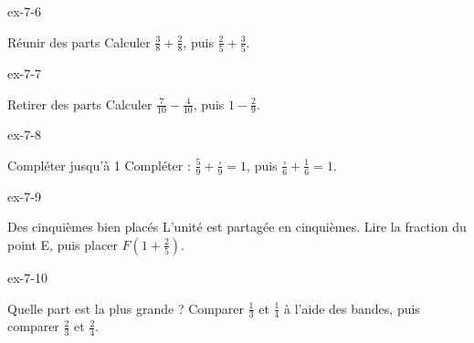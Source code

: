 \begin{blocLivre}{ex-7-6}\begin{exercice}[2]{Réunir des parts}
Calculer $\frac38+\frac28$, puis $\frac25+\frac35$.
\end{exercice}\end{blocLivre}
\begin{blocLivre}{ex-7-7}\begin{exercice}[2]{Retirer des parts}
Calculer $\frac7{10}-\frac4{10}$, puis $1-\frac29$.
\end{exercice}\end{blocLivre}
\begin{blocLivre}{ex-7-8}\begin{exercice}[2]{Compléter jusqu’à 1}
Compléter : $\frac59+\frac{\square}9=1$, puis $\frac{\square}6+\frac16=1$.
\end{exercice}\end{blocLivre}
\begin{blocLivre}{ex-7-9}\begin{exercice}[2]{Des cinquièmes bien placés}
L’unité est partagée en cinquièmes. Lire la fraction du point E, puis placer $F\left(1+\frac25\right)$.
\label{fig-ex-7-9}
\end{exercice}\end{blocLivre}
\begin{blocLivre}{ex-7-10}\begin{exercice}[2]{Quelle part est la plus grande ?}
Comparer $\frac13$ et $\frac14$ à l’aide des bandes, puis comparer $\frac23$ et $\frac24$.
\label{fig-ex-7-10}
\end{exercice}\end{blocLivre}

